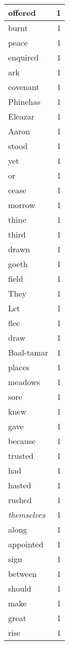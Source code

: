 \begin{center}
\begin{longtable}{l|r}
offered & 1 \\ \hline
burnt & 1 \\ \hline
peace & 1 \\ \hline
enquired & 1 \\ \hline
ark & 1 \\ \hline
covenant & 1 \\ \hline
Phinehas & 1 \\ \hline
Eleazar & 1 \\ \hline
Aaron & 1 \\ \hline
stood & 1 \\ \hline
yet & 1 \\ \hline
or & 1 \\ \hline
cease & 1 \\ \hline
morrow & 1 \\ \hline
thine & 1 \\ \hline
third & 1 \\ \hline
drawn & 1 \\ \hline
goeth & 1 \\ \hline
field & 1 \\ \hline
They & 1 \\ \hline
Let & 1 \\ \hline
flee & 1 \\ \hline
draw & 1 \\ \hline
Baal-tamar & 1 \\ \hline
places & 1 \\ \hline
meadows & 1 \\ \hline
sore & 1 \\ \hline
knew & 1 \\ \hline
gave & 1 \\ \hline
because & 1 \\ \hline
trusted & 1 \\ \hline
had & 1 \\ \hline
hasted & 1 \\ \hline
rushed & 1 \\ \hline
\emph{themselves} & 1 \\ \hline
along & 1 \\ \hline
appointed & 1 \\ \hline
sign & 1 \\ \hline
between & 1 \\ \hline
should & 1 \\ \hline
make & 1 \\ \hline
great & 1 \\ \hline
rise & 1 \\ \hline

\end{longtable}
\end{center}
